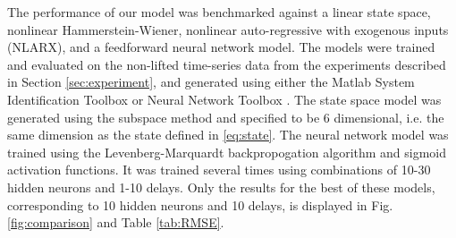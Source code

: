 The performance of our model was benchmarked against a linear state space, nonlinear Hammerstein-Wiener, nonlinear auto-regressive with exogenous inputs (NLARX), and a feedforward neural network model.
The models were trained and evaluated on the non-lifted time-series data from the experiments described in Section \ref{sec:experiment}, and generated using either the Matlab System Identification Toolbox or Neural Network Toolbox \cite{MATLAB:2017}.
The state space model was generated using the subspace method \cite[Chapter 7]{ljung1987system} and specified to be 6 dimensional, i.e. the same dimension as the state defined in \ref{eq:state}.
The neural network model was trained using the Levenberg-Marquardt backpropogation algorithm and sigmoid activation functions.
It was trained several times using combinations of 10-30 hidden neurons and 1-10 delays.
Only the results for the best of these models, corresponding to 10 hidden neurons and 10 delays, is displayed in Fig. \ref{fig:comparison} and Table \ref{tab:RMSE}.